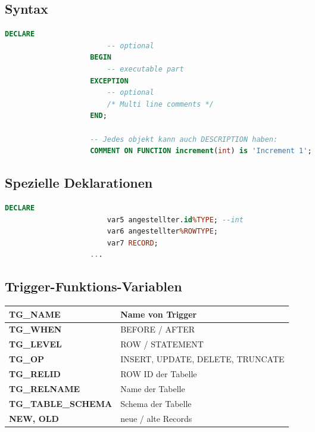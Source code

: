 \documentclass[a4paper, landscape, 8pt]{scrartcl}
\begin{document}
\begin{multicols*}{4}
        \subsection{Syntax}
        \begin{lstlisting}[language=sql]
                    DECLARE
                        -- optional
                    BEGIN
                        -- executable part
                    EXCEPTION
                        -- optional
                        /* Multi line comments */
                    END;

                    -- Jedes objekt kann auch DESCRIPTION haben:
                    COMMENT ON FUNCTION increment(int) is 'Increment 1';
        \end{lstlisting}

        \subsection{Spezielle Deklarationen}
        \begin{lstlisting}[language=sql]
                    DECLARE
                        var5 angestellter.id%TYPE; --int
                        var6 angestellter%ROWTYPE;
                        var7 RECORD;
                    ...
        \end{lstlisting}

        \subsection{Trigger-Funktions-Variablen}
        \begin{tabularx}{\columnwidth}{l | X}
            \textbf{TG\_NAME} & Name von Trigger \\
            \hline
            \textbf{TG\_WHEN} & BEFORE / AFTER \\
            \hline
            \textbf{TG\_LEVEL} & ROW / STATEMENT \\
            \hline
            \textbf{TG\_OP} & INSERT, UPDATE, DELETE, TRUNCATE \\
            \hline
            \textbf{TG\_RELID} & ROW ID der Tabelle \\
            \hline
            \textbf{TG\_RELNAME} & Name der Tabelle \\
            \hline
            \textbf{TG\_TABLE\_SCHEMA} & Schema der Tabelle \\
            \hline
            \textbf{NEW, OLD} & neue / alte Records
        \end{tabularx}


\end{multicols*}
\end{document}
